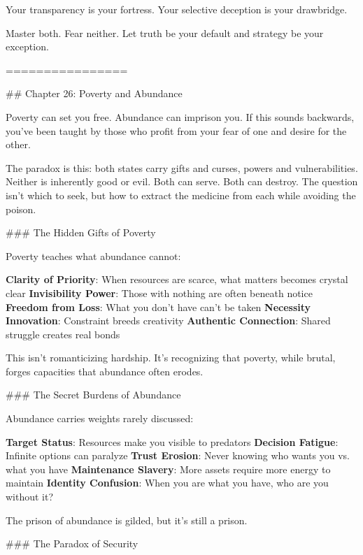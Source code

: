 \documentclass[12pt]{book}
\begin{document}
Your transparency is your fortress. Your selective deception is your drawbridge.

Master both. Fear neither. Let truth be your default and strategy be your exception.

================

\#\# Chapter 26: Poverty and Abundance

Poverty can set you free. Abundance can imprison you. If this sounds backwards, you've been taught by those who profit from your fear of one and desire for the other.

The paradox is this: both states carry gifts and curses, powers and vulnerabilities. Neither is inherently good or evil. Both can serve. Both can destroy. The question isn't which to seek, but how to extract the medicine from each while avoiding the poison.

\#\#\# The Hidden Gifts of Poverty

Poverty teaches what abundance cannot:

\textbf{Clarity of Priority}: When resources are scarce, what matters becomes crystal clear
\textbf{Invisibility Power}: Those with nothing are often beneath notice
\textbf{Freedom from Loss}: What you don't have can't be taken
\textbf{Necessity Innovation}: Constraint breeds creativity
\textbf{Authentic Connection}: Shared struggle creates real bonds

This isn't romanticizing hardship. It's recognizing that poverty, while brutal, forges capacities that abundance often erodes.

\#\#\# The Secret Burdens of Abundance

Abundance carries weights rarely discussed:

\textbf{Target Status}: Resources make you visible to predators
\textbf{Decision Fatigue}: Infinite options can paralyze
\textbf{Trust Erosion}: Never knowing who wants you vs. what you have
\textbf{Maintenance Slavery}: More assets require more energy to maintain
\textbf{Identity Confusion}: When you are what you have, who are you without it?

The prison of abundance is gilded, but it's still a prison.

\#\#\# The Paradox of Security
\end{document}
